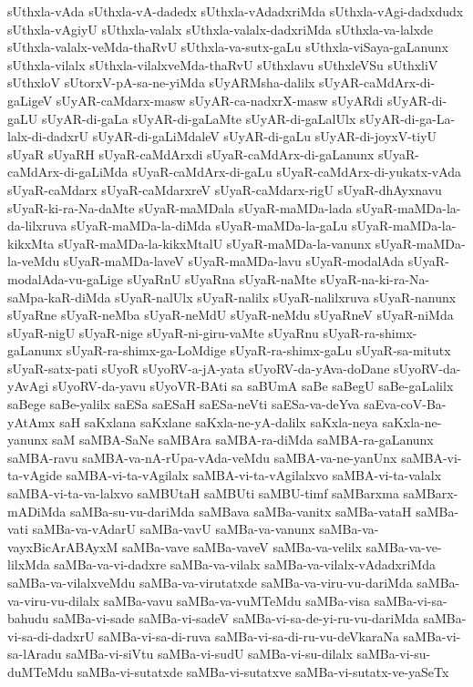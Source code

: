 {sUthxla-vAda
sUthxla-vA-dadedx
sUthxla-vAdadxriMda
sUthxla-vAgi-dadxdudx
sUthxla-vAgiyU
sUthxla-valalx
sUthxla-valalx-dadxriMda
sUthxla-va-lalxde
sUthxla-valalx-veMda-thaRvU
sUthxla-va-sutx-gaLu
sUthxla-viSaya-gaLanunx
sUthxla-vilalx
sUthxla-vilalxveMda-thaRvU
sUthxlavu
sUthxleVSu
sUthxliV
sUthxloV
sUtorxV-pA-sa-ne-yiMda
sUyARMsha-dalilx
sUyAR-caMdArx-di-gaLigeV
sUyAR-caMdarx-masw
sUyAR-ca-nadxrX-masw
sUyARdi
sUyAR-di-gaLU
sUyAR-di-gaLa
sUyAR-di-gaLaMte
sUyAR-di-gaLalUlx
sUyAR-di-ga-La-lalx-di-dadxrU
sUyAR-di-gaLiMdaleV
sUyAR-di-gaLu
sUyAR-di-joyxV-tiyU
sUyaR
sUyaRH
sUyaR-caMdArxdi
sUyaR-caMdArx-di-gaLanunx
sUyaR-caMdArx-di-gaLiMda
sUyaR-caMdArx-di-gaLu
sUyaR-caMdArx-di-yukatx-vAda
sUyaR-caMdarx
sUyaR-caMdarxreV
sUyaR-caMdarx-rigU
sUyaR-dhAyxnavu
sUyaR-ki-ra-Na-daMte
sUyaR-maMDala
sUyaR-maMDa-lada
sUyaR-maMDa-la-da-lilxruva
sUyaR-maMDa-la-diMda
sUyaR-maMDa-la-gaLu
sUyaR-maMDa-la-kikxMta
sUyaR-maMDa-la-kikxMtalU
sUyaR-maMDa-la-vanunx
sUyaR-maMDa-la-veMdu
sUyaR-maMDa-laveV
sUyaR-maMDa-lavu
sUyaR-modalAda
sUyaR-modalAda-vu-gaLige
sUyaRnU
sUyaRna
sUyaR-naMte
sUyaR-na-ki-ra-Na-saMpa-kaR-diMda
sUyaR-nalUlx
sUyaR-nalilx
sUyaR-nalilxruva
sUyaR-nanunx
sUyaRne
sUyaR-neMba
sUyaR-neMdU
sUyaR-neMdu
sUyaRneV
sUyaR-niMda
sUyaR-nigU
sUyaR-nige
sUyaR-ni-giru-vaMte
sUyaRnu
sUyaR-ra-shimx-gaLanunx
sUyaR-ra-shimx-ga-LoMdige
sUyaR-ra-shimx-gaLu
sUyaR-sa-mitutx
sUyaR-satx-pati
sUyoR
sUyoRV-a-jA-yata
sUyoRV-da-yAva-doDane
sUyoRV-da-yAvAgi
sUyoRV-da-yavu
sUyoVR-BAti
sa
saBUmA
saBe
saBegU
saBe-gaLalilx
saBege
saBe-yalilx
saESa
saESaH
saESa-neVti
saESa-va-deYva
saEva-coV-Ba-yAtAmx
saH
saKxlana
saKxlane
saKxla-ne-yA-dalilx
saKxla-neya
saKxla-ne-yanunx
saM
saMBA-SaNe
saMBAra
saMBA-ra-diMda
saMBA-ra-gaLanunx
saMBA-ravu
saMBA-va-nA-rUpa-vAda-veMdu
saMBA-va-ne-yanUnx
saMBA-vi-ta-vAgide
saMBA-vi-ta-vAgilalx
saMBA-vi-ta-vAgilalxvo
saMBA-vi-ta-valalx
saMBA-vi-ta-va-lalxvo
saMBUtaH
saMBUti
saMBU-timf
saMBarxma
saMBarx-mADiMda
saMBa-su-vu-dariMda
saMBava
saMBa-vanitx
saMBa-vataH
saMBa-vati
saMBa-va-vAdarU
saMBa-vavU
saMBa-va-vanunx
saMBa-va-vayxBicArABAyxM
saMBa-vave
saMBa-vaveV
saMBa-va-velilx
saMBa-va-ve-lilxMda
saMBa-va-vi-dadxre
saMBa-va-vilalx
saMBa-va-vilalx-vAdadxriMda
saMBa-va-vilalxveMdu
saMBa-va-virutatxde
saMBa-va-viru-vu-dariMda
saMBa-va-viru-vu-dilalx
saMBa-vavu
saMBa-va-vuMTeMdu
saMBa-visa
saMBa-vi-sa-bahudu
saMBa-vi-sade
saMBa-vi-sadeV
saMBa-vi-sa-de-yi-ru-vu-dariMda
saMBa-vi-sa-di-dadxrU
saMBa-vi-sa-di-ruva
saMBa-vi-sa-di-ru-vu-deVkaraNa
saMBa-vi-sa-lAradu
saMBa-vi-siVtu
saMBa-vi-sudU
saMBa-vi-su-dilalx
saMBa-vi-su-duMTeMdu
saMBa-vi-sutatxde
saMBa-vi-sutatxve
saMBa-vi-sutatx-ve-yaSeTx
}
